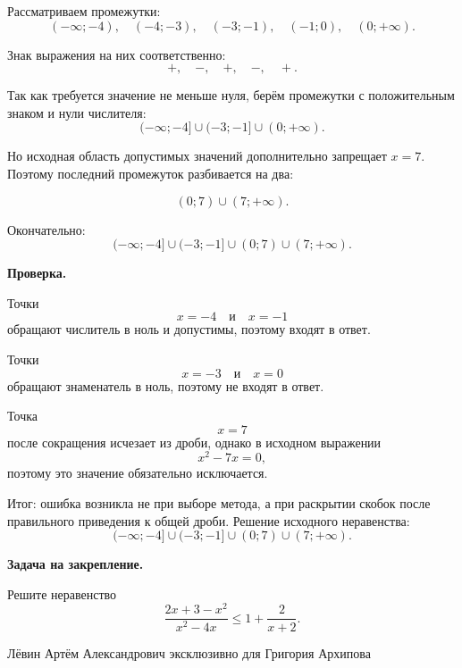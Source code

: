 \documentclass[12pt,a4paper]{article}
\newcommand{\resultlabel}[1]{\textcolor{reviewteal!80!black}{Итог:} #1}
\begin{document}
Рассматриваем промежутки:
\[
(-\infty;-4),\quad
(-4;-3),\quad
(-3;-1),\quad
(-1;0),\quad
(0;+\infty).
\]

Знак выражения на них соответственно:
\[
+,\quad -,\quad +,\quad -,\quad +.
\]

Так как требуется значение не меньше нуля, берём промежутки с положительным
знаком и нули числителя:
\[
(-\infty;-4]
\cup
(-3;-1]
\cup
(0;+\infty).
\]

Но исходная область допустимых значений дополнительно запрещает $x=7$.
Поэтому последний промежуток разбивается на два:

\[
(0;7)\cup(7;+\infty).
\]

Окончательно:
\[
\boxed{
(-\infty;-4]
\cup
(-3;-1]
\cup
(0;7)
\cup
(7;+\infty)
}.
\]

\textbf{Проверка.}

Точки
\[
x=-4
\quad\text{и}\quad
x=-1
\]
обращают числитель в ноль и допустимы, поэтому входят в ответ.

Точки
\[
x=-3
\quad\text{и}\quad
x=0
\]
обращают знаменатель в ноль, поэтому не входят в ответ.

Точка
\[
x=7
\]
после сокращения исчезает из дроби, однако в исходном выражении
\[
x^2-7x=0,
\]
поэтому это значение обязательно исключается.

\resultlabel{ ошибка возникла не при выборе метода, а при раскрытии скобок после правильного приведения к общей дроби. Решение исходного неравенства:
\[
(-\infty;-4]\cup(-3;-1]\cup(0;7)\cup(7;+\infty).
\]
}

\textbf{Задача на закрепление.}

Решите неравенство
\[
\frac{2x+3-x^2}{x^2-4x}
\le
1+\frac{2}{x+2}.
\]

\vfill

\begin{center}
\small
Лёвин Артём Александрович эксклюзивно для Григория Архипова
\end{center}

\end{document}
